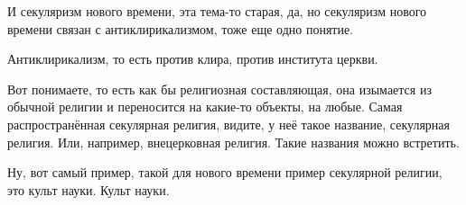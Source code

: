 И секуляризм нового времени, эта тема-то старая, да, но
секуляризм нового времени связан с антиклирикализмом, тоже еще одно понятие.


Антиклирикализм, то есть против клира, против института церкви. 



Вот понимаете, то есть как бы религиозная
составляющая, она изымается из обычной религии и переносится на какие-то
объекты, на любые. Самая распространённая секулярная религия, видите, у неё
такое название, секулярная религия. Или, например, внецерковная религия. Такие
названия можно встретить. 

Ну, вот самый пример, такой для нового времени пример
секулярной религии, это культ науки. Культ науки. 

